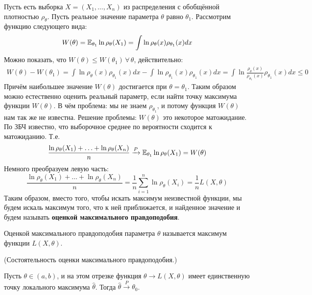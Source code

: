 Пусть есть выборка $X = (X_1, \ldots, X_n)$ из распределения с обобщённой плотностью $\rho_{\theta}$. Пусть реальное значение параметра $\theta$
равно $\theta_1$. Рассмотрим функцию следующего вида:
\[
    W(\theta) = \mathbb{E}_{\theta_1}\ln\rho_{\theta}(X_1) = \int \ln\rho_{\theta}(x)\rho_{\theta_1}(x)dx
\]
Можно показать, что $W(\theta) \leq W(\theta_1)\,\forall\,\theta$, действительно:
\begin{align*}
    W(\theta) - W(\theta_1) = \int \ln\rho_{\theta}(x)\rho_{\theta_1}(x)dx - \int \ln\rho_{\theta_1}(x)\rho_{\theta_1}(x)dx =
    \int \ln\frac{\rho_{\theta}(x)}{\rho_{\theta_1}(x)}\rho_{\theta_1}(x)dx \leq 0
\end{align*}
Причём наибольшее значение $W(\theta)$ достигается при $\theta = \theta_1$. Таким образом можно естественно оценить реальный параметр, если найти точку
максимума функции $W(\theta)$. В чём проблема: мы не знаем $\rho_{\theta_1}$, и потому функция $W(\theta)$ нам так же не известна. Решение проблемы:
$W(\theta)$ это некоторое матожидание. По ЗБЧ известно, что выборочное среднее по вероятности сходится к матожиданию. Т.е.
\[
    \frac{\ln\rho_{\theta}(X_1) + \ldots + \ln\rho_{\theta}(X_n)}{n} \xrightarrow{P} \mathbb{E}_{\theta_1}\ln\rho_{\theta}(X_1) = W(\theta)
\]
Немного преобразуем левую часть:
\[
    \frac{\ln\rho_{\theta}(X_1) + \ldots + \ln\rho_{\theta}(X_n)}{n} = \frac{1}{n}\sum_{i = 1}^{n} \ln\rho_{\theta}(X_i) = \frac{1}{n}L(X, \theta)
\]
Таким образом, вместо того, чтобы искать максимум неизвестной функции, мы будем искаль максимум того, что к ней приближается, и найденное значение и будем
называть \textbf{оценкой максимального правдоподобия}.
\begin{definition}
    Оценкой максимального правдоподобия параметра $\theta$ называется максимум функции $L(X, \theta)$.
\end{definition}
\begin{proposal} (Состоятельность оценки максимального правдоподобия.)

    Пусть $\theta \in (a, b)$, и на этом отрезке функция $\theta \to L(X, \theta)$ имеет единственную точку локального максимума $\hat{\theta}$.
    Тогда $\hat{\theta} \xrightarrow{P} \theta_0$.
\end{proposal}
